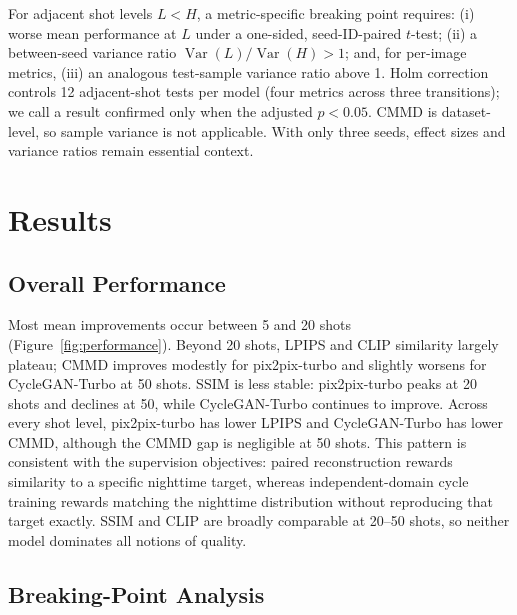 \documentclass{article}
\begin{document}
For adjacent shot levels $L<H$, a metric-specific breaking point requires: (i) worse mean performance at $L$ under a one-sided, seed-ID-paired $t$-test; (ii) a between-seed variance ratio $\operatorname{Var}(L)/\operatorname{Var}(H)>1$; and, for per-image metrics, (iii) an analogous test-sample variance ratio above 1. Holm correction controls 12 adjacent-shot tests per model (four metrics across three transitions); we call a result confirmed only when the adjusted $p<0.05$. CMMD is dataset-level, so sample variance is not applicable. With only three seeds, effect sizes and variance ratios remain essential context.

\section{Results}

\subsection{Overall Performance}

Most mean improvements occur between 5 and 20 shots (Figure~\ref{fig:performance}). Beyond 20 shots, LPIPS and CLIP similarity largely plateau; CMMD improves modestly for pix2pix-turbo and slightly worsens for CycleGAN-Turbo at 50 shots. SSIM is less stable: pix2pix-turbo peaks at 20 shots and declines at 50, while CycleGAN-Turbo continues to improve. Across every shot level, pix2pix-turbo has lower LPIPS and CycleGAN-Turbo has lower CMMD, although the CMMD gap is negligible at 50 shots. This pattern is consistent with the supervision objectives: paired reconstruction rewards similarity to a specific nighttime target, whereas independent-domain cycle training rewards matching the nighttime distribution without reproducing that target exactly. SSIM and CLIP are broadly comparable at 20--50 shots, so neither model dominates all notions of quality.

\subsection{Breaking-Point Analysis}
\end{document}

